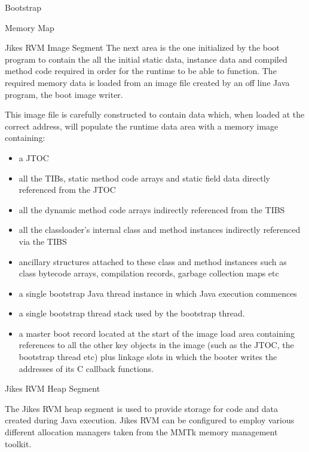 \begin{section}{Bootstrap}
\begin{subsection}{Memory Map}
\begin{subsubsection}{Jikes RVM Image Segment}
The next area is the one initialized by the boot program to contain the all the initial static data, instance data and compiled method code required in order for the runtime to be able to function. The required memory data is loaded from an image file created by an off line Java program, the boot image writer.

This image file is carefully constructed to contain data which, when loaded at the correct address, will populate the runtime data area with a memory image containing:

\begin{itemize}
  \item a JTOC
  \item all the TIBs, static method code arrays and static field data directly referenced from the JTOC
  \item all the dynamic method code arrays indirectly referenced from the TIBS
  \item all the classloader's internal class and method instances indirectly referenced via the TIBS
  \item ancillary structures attached to these class and method instances such as class bytecode arrays, compilation records, garbage collection maps etc
  \item a single bootstrap Java thread instance in which Java execution commences
  \item a single bootstrap thread stack used by the bootstrap thread.
  \item a master boot record located at the start of the image load area containing references to all the other key objects in the image (such as the JTOC, the bootstrap thread etc) plus linkage slots in which the booter writes the addresses of its C callback functions.
\end{itemize}

\end{subsubsection}

\begin{subsubsection}{Jikes RVM Heap Segment}

The Jikes RVM heap segment is used to provide storage for code and data created during Java execution. Jikes RVM can be configured to employ various different allocation managers taken from the MMTk memory management toolkit.

\end{subsubsection}

\end{subsection}

\end{section}
